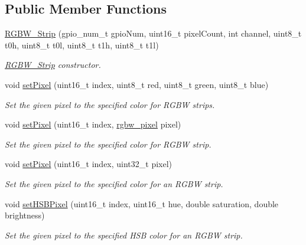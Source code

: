 \subsection*{Public Member Functions}
\begin{DoxyCompactItemize}
\item 
\mbox{\hyperlink{classRGBW__Strip_a9d6003c75a32d2f9eec4af86caa1cea1}{R\+G\+B\+W\+\_\+\+Strip}} (gpio\+\_\+num\+\_\+t gpio\+Num, uint16\+\_\+t pixel\+Count, int channel, uint8\+\_\+t t0h, uint8\+\_\+t t0l, uint8\+\_\+t t1h, uint8\+\_\+t t1l)
\begin{DoxyCompactList}\small\item\em \mbox{\hyperlink{classRGBW__Strip}{R\+G\+B\+W\+\_\+\+Strip}} constructor. \end{DoxyCompactList}\item 
void \mbox{\hyperlink{classRGBW__Strip_a8f9f94859f06a93b7230fd9db261897e}{set\+Pixel}} (uint16\+\_\+t index, uint8\+\_\+t red, uint8\+\_\+t green, uint8\+\_\+t blue)
\begin{DoxyCompactList}\small\item\em Set the given pixel to the specified color for R\+G\+BW strips. \end{DoxyCompactList}\item 
void \mbox{\hyperlink{classRGBW__Strip_a8c4af9331a1d0c3c7bbef32fa7f12eea}{set\+Pixel}} (uint16\+\_\+t index, \mbox{\hyperlink{structrgbw__pixel}{rgbw\+\_\+pixel}} pixel)
\begin{DoxyCompactList}\small\item\em Set the given pixel to the specified color for R\+G\+BW strip. \end{DoxyCompactList}\item 
void \mbox{\hyperlink{classRGBW__Strip_abb0bc96591def8495aa076695967dd30}{set\+Pixel}} (uint16\+\_\+t index, uint32\+\_\+t pixel)
\begin{DoxyCompactList}\small\item\em Set the given pixel to the specified color for an R\+G\+BW strip. \end{DoxyCompactList}\item 
void \mbox{\hyperlink{classRGBW__Strip_af6ee14cf6524b367d7c6390c2d3858da}{set\+H\+S\+B\+Pixel}} (uint16\+\_\+t index, uint16\+\_\+t hue, double saturation, double brightness)
\begin{DoxyCompactList}\small\item\em Set the given pixel to the specified H\+SB color for an R\+G\+BW strip. \end{DoxyCompactList}\item 

\end{DoxyCompactItemize}
